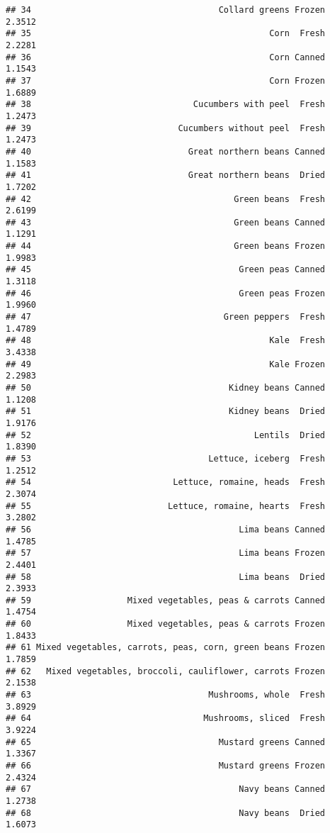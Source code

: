 \documentclass[
]{article}
\begin{document}
\begin{verbatim}
## 34                                     Collard greens Frozen      2.3512
## 35                                               Corn  Fresh      2.2281
## 36                                               Corn Canned      1.1543
## 37                                               Corn Frozen      1.6889
## 38                                Cucumbers with peel  Fresh      1.2473
## 39                             Cucumbers without peel  Fresh      1.2473
## 40                               Great northern beans Canned      1.1583
## 41                               Great northern beans  Dried      1.7202
## 42                                        Green beans  Fresh      2.6199
## 43                                        Green beans Canned      1.1291
## 44                                        Green beans Frozen      1.9983
## 45                                         Green peas Canned      1.3118
## 46                                         Green peas Frozen      1.9960
## 47                                      Green peppers  Fresh      1.4789
## 48                                               Kale  Fresh      3.4338
## 49                                               Kale Frozen      2.2983
## 50                                       Kidney beans Canned      1.1208
## 51                                       Kidney beans  Dried      1.9176
## 52                                            Lentils  Dried      1.8390
## 53                                   Lettuce, iceberg  Fresh      1.2512
## 54                            Lettuce, romaine, heads  Fresh      2.3074
## 55                           Lettuce, romaine, hearts  Fresh      3.2802
## 56                                         Lima beans Canned      1.4785
## 57                                         Lima beans Frozen      2.4401
## 58                                         Lima beans  Dried      2.3933
## 59                   Mixed vegetables, peas & carrots Canned      1.4754
## 60                   Mixed vegetables, peas & carrots Frozen      1.8433
## 61 Mixed vegetables, carrots, peas, corn, green beans Frozen      1.7859
## 62   Mixed vegetables, broccoli, cauliflower, carrots Frozen      2.1538
## 63                                   Mushrooms, whole  Fresh      3.8929
## 64                                  Mushrooms, sliced  Fresh      3.9224
## 65                                     Mustard greens Canned      1.3367
## 66                                     Mustard greens Frozen      2.4324
## 67                                         Navy beans Canned      1.2738
## 68                                         Navy beans  Dried      1.6073

\end{verbatim}
\end{document}
